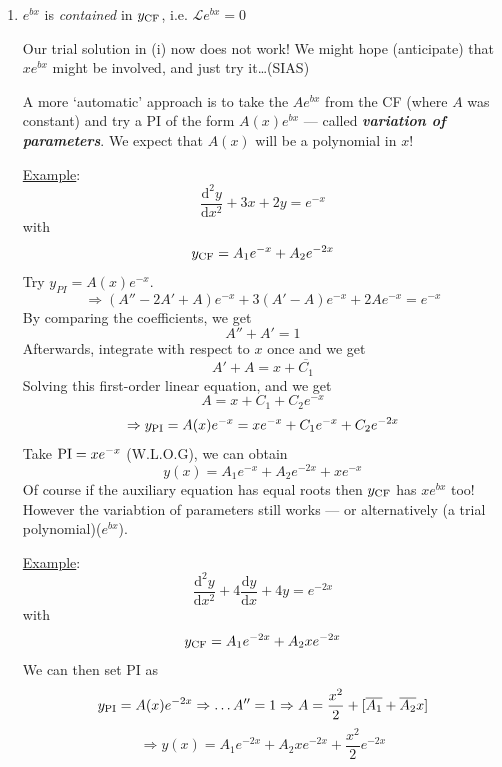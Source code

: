 \documentclass[12pt]{report}
\theoremstyle{definition}
\begin{document}
\begin{enumerate}[label = (\alph*)]
\begin{enumerate}[label = (\roman*)]
            \item $e^{bx}$ is \emph{contained} in $y_{\textnormal{CF}}$, i.e. $\mathscr{L} e^{bx} = 0$
                \smallskip
                
                Our trial solution in (i) now does not work!
                We might hope (anticipate) that $xe^{bx}$ might be involved, and just try it\ldots (SIAS)
                
                A more `automatic' approach is to take the $Ae^{bx}$ from the CF (where $A$ was constant)
                and try a PI of the form $A(x)e^{bx}$ --- called \textbf{\emph{variation of parameters}}.
                We expect that $A(x)$ will be a polynomial in $x$!
                
                \underline{Example}: \[
                    \frac{\mathrm{d}^{2}y}{\mathrm{d}x^{2}} + 3x + 2y = e^{-x}
                \]with\[
                y_{\textnormal{CF}} = A_1 e^{-x} + A_2 e^{-2x}
                \]
                Try $y_{PI} = A(x) e^{-x}$.\[
                    \Rightarrow (A'' - 2A' + A) e^{-x} + 3(A' - A) e^{-x} + 2Ae^{-x} = e^{-x}
                \]
                By comparing the coefficients, we get\[
                A'' + A' = 1 
                \] 
                Afterwards, integrate with respect to $x$ once and we get \[
                A' + A = x + \overline{C_1}
                \]
                Solving this first-order linear equation, and we get \[
                    A = x + C_1 + C_2 e^{-x}
                \]\[
                \Rightarrow y_{\textnormal{PI}} = A(x)e^{-x}
                = xe^{-x} + C_1 e^{-x} + C_2 e^{-2x}
                \]
                Take $\textnormal{PI} = xe^{-x}$ (W.L.O.G), we can obtain\[
                    y(x) = A_1 e^{-x} + A_2 e^{-2x} + x e^{-x}
                \]
                Of course if the auxiliary equation has equal roots then $y_{\textnormal{CF}}$
                has $xe^{bx}$ too! However the variabtion of parameters still works
                --- or alternatively (a trial polynomial)($e^{bx}$).%

                \underline{Example}: \[
                    \frac{\mathrm{d}^{2}y}{\mathrm{d}x^{2}} + 4 \frac{\mathrm{d}y}{\mathrm{d}x} + 4y = e^{-2x}
                \]with\[
                y_{\textnormal{CF}} = A_1 e^{-2x} + A_2 xe^{-2x}
                \]
                We can then set PI as\[
                    y_{\textnormal{PI}} = A(x)e^{-2x} 
                    \Rightarrow \ldots A'' = 1
                    \Rightarrow A = \frac{x^{2}}{2} + [\overline{A_1} + \overline{A_2}x]
                \]\[
                \Rightarrow y(x) = A_1 e^{-2x} + A_2 xe^{-2x} + \frac{x^{2}}{2}e^{-2x}
                \]


\end{enumerate}
\end{enumerate}
\end{document}
